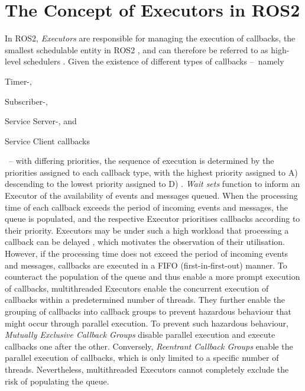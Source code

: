 \section{The Concept of Executors in ROS2} \label{sec:model:executors}
    In ROS2, \emph{Executors} are responsible for managing the execution of callbacks, \glqq{}the smallest schedulable entity in ROS2\grqq{} \cite[p.~2]{ROS2executors}, and can therefore be referred to as high-level schedulers \cite[p.~6512]{ros2_tracing}.
    Given the existence of different types of callbacks --~namely
    \begin{enumerate*}[label=\Alph*)]
        \item Timer-,
        \item Subscriber-,
        \item Service Server-, and
        \item Service Client callbacks
    \end{enumerate*}~-- with differing priorities, the sequence of execution is determined by the priorities assigned to each callback type, with the highest priority assigned to A) descending to the lowest priority assigned to D) \cite{website:Jazzy:ros2Executors}\cite[p.~3]{ROS2executors}. \newline
    \emph{Wait sets} function to inform an Executor of the availability of events and messages queued. When the processing time of each callback exceeds the period of incoming events and messages, the queue is populated, and the respective Executor prioritises callbacks according to their priority. Executors may be under such a high workload that processing a callback can be delayed \cite[p.~7ff]{ros2_tracing:msgFlowAnalysis}, which motivates the observation of their utilisation.
    However, if the processing time does not exceed the period of incoming events and messages, callbacks are executed in a FIFO (first-in-first-out) manner. \cite{website:Jazzy:ros2Executors}\cite{ROS2executors}\newline
    To counteract the population of the queue and thus enable a more prompt execution of callbacks, multithreaded Executors enable the concurrent execution of callbacks within a predetermined number of threads. They further enable the grouping of callbacks into callback groups to prevent hazardous behaviour that might occur through parallel execution. To prevent such hazardous behaviour, \emph{Mutually Exclusive Callback Groups} disable parallel execution and execute callbacks one after the other. Conversely, \emph{Reentrant Callback Groups} enable the parallel execution of callbacks, which is only limited to a specific number of threads. Nevertheless, multithreaded Executors cannot completely exclude the risk of populating the queue. \cite{website:Jazzy:ros2Executors}


